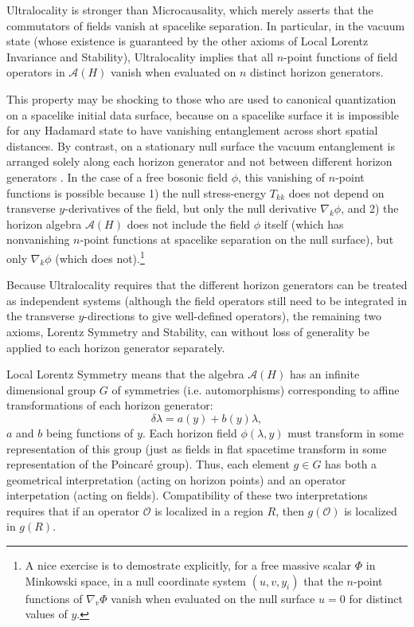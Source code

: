 \documentclass[12pt]{article}
\begin{document}
Ultralocality is stronger than Microcausality, which merely asserts that the commutators of fields vanish at spacelike separation.  In particular, in the vacuum state (whose existence is guaranteed by the other axioms of Local Lorentz Invariance and Stability), Ultralocality implies that all $n$-point functions of field operators in $\mathcal{A}(H)$ vanish when evaluated on $n$ distinct horizon generators.

This property may be shocking to those who are used to canonical quantization on a spacelike initial data surface, because on a spacelike surface it is impossible for any Hadamard state to have vanishing entanglement across short spatial distances.  By contrast, on a stationary null surface the vacuum entanglement is arranged solely along each horizon generator and not between different horizon generators \cite{schroer09}.  In the case of a free bosonic field $\phi$, this vanishing of $n$-point functions is possible because 1) the null stress-energy $T_{kk}$ does not depend on transverse $y$-derivatives of the field, but only the null derivative $\nabla_k \phi$, and 2) the horizon algebra $\mathcal{A}(H)$ does not include the field $\phi$ itself (which has nonvanishing $n$-point functions at spacelike separation on the null surface), but only $\nabla_k \phi$ (which does not).\footnote{A nice exercise is to demostrate explicitly, for a free massive scalar $\Phi$ in Minkowski space, in a null coordinate system $(u, v, y_i)$ that the $n$-point functions of $\nabla_v \Phi$ vanish when evaluated on the null surface $u = 0$ for distinct values of $y$.}

Because Ultralocality requires that the different horizon generators can be treated as independent systems (although the field operators still need to be integrated in the transverse $y$-directions to give well-defined operators), the remaining two axioms, Lorentz Symmetry and Stability, can without loss of generality be applied to each horizon generator separately.

Local Lorentz Symmetry means that the algebra $\mathcal{A}(H)$ has an infinite dimensional group $G$ of symmetries (i.e. automorphisms) corresponding to affine transformations of each horizon generator:
\begin{equation}
\delta \lambda = a(y) + b(y) \lambda,
\end{equation}
$a$ and $b$ being functions of $y$.  Each horizon field $\phi(\lambda, y)$ must transform in some representation of this group (just as fields in flat spacetime transform in some representation of the Poincar\'{e} group).  Thus, each element $g \in G$ has both a geometrical interpretation (acting on horizon points) and an operator interpetation (acting on fields).  Compatibility of these two interpretations requires that if an operator $\mathcal{O}$ is localized in a region $R$, then $g(\mathcal{O})$ is localized in $g(R)$.
\end{document}
